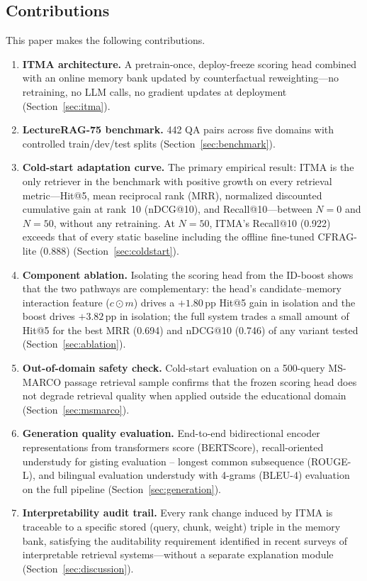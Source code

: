 \documentclass[journal]{IEEEtran}
\begin{document}
\subsection{Contributions}
This paper makes the following contributions.
\begin{enumerate}
  \item \textbf{ITMA architecture.}  A pretrain-once, deploy-freeze scoring
        head combined with an online memory bank updated by counterfactual
        reweighting---no retraining, no LLM calls, no gradient updates at
        deployment (Section~\ref{sec:itma}).
  \item \textbf{LectureRAG-75 benchmark.}  442 QA pairs across five domains
        with controlled train/dev/test splits (Section~\ref{sec:benchmark}).
  \item \textbf{Cold-start adaptation curve.}  The primary empirical result:
        ITMA is the only retriever in the benchmark with positive growth on
        every retrieval metric---Hit@5, mean reciprocal rank (MRR),
        normalized discounted cumulative gain at rank~10 (nDCG@10), and
        Recall@10---between
        $N{=}0$ and $N{=}50$, without any retraining.  At $N{=}50$, ITMA's
        Recall@10 (0.922) exceeds that of every static baseline including
        the offline fine-tuned CFRAG-lite (0.888)
        (Section~\ref{sec:coldstart}).
  \item \textbf{Component ablation.}  Isolating the scoring head from the
        ID-boost shows that the two pathways are complementary: the head's
        candidate--memory interaction feature ($c{\odot}m$) drives a
        $+1.80$\,pp Hit@5 gain in isolation and the boost drives $+3.82$\,pp
        in isolation; the full system trades a small amount of Hit@5
        for the best MRR (0.694) and nDCG@10 (0.746) of any variant tested
        (Section~\ref{sec:ablation}).
  \item \textbf{Out-of-domain safety check.} Cold-start evaluation on a
        500-query MS-MARCO passage retrieval sample confirms that the frozen
        scoring head does not degrade retrieval quality when applied outside
        the educational domain (Section~\ref{sec:msmarco}).
  \item \textbf{Generation quality evaluation.}  End-to-end
        bidirectional encoder representations from transformers score
        (BERTScore), recall-oriented understudy for gisting evaluation --
        longest common subsequence (ROUGE-L), and bilingual evaluation
        understudy with 4-grams (BLEU-4) evaluation on the full pipeline
        (Section~\ref{sec:generation}).
  \item \textbf{Interpretability audit trail.}  Every rank change induced
        by ITMA is traceable to a specific stored (query, chunk, weight)
        triple in the memory bank, satisfying the auditability requirement
        identified in recent surveys of interpretable retrieval
        systems---without a separate explanation module
        (Section~\ref{sec:discussion}).
\end{enumerate}
\end{document}
